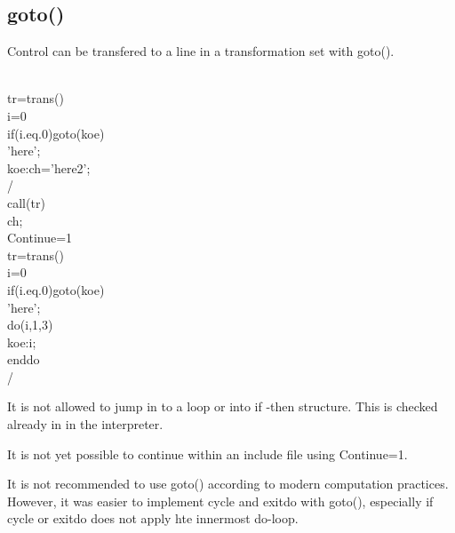 \subsection{\textcolor{VioletRed}{goto}()}
\label{goto}
Control can be transfered to a line in a transformation set with \textcolor{VioletRed}{goto}().
\begin{example}[gotoex]\\
\label{gotoex}
tr=\textcolor{VioletRed}{trans}()\\
i=0\\
\textcolor{VioletRed}{if}(i.eq.0)\textcolor{VioletRed}{goto}(koe)\\
'here';\\
koe:ch='here2';\\
/\\
\textcolor{VioletRed}{call}(tr)\\
ch;\\
Continue=1\\
tr=\textcolor{VioletRed}{trans}()\\
i=0\\
\textcolor{VioletRed}{if}(i.eq.0)\textcolor{VioletRed}{goto}(koe)\\
'here';\\
\textcolor{VioletRed}{do}(i,1,3)\\
koe:i;\\
enddo\\
/
\end{example}
\begin{note}
It is not allowed to jump in to a loop or into if -then structure. This is
checked already in in the interpreter.
\end{note}
\begin{note}
It is not yet possible to continue within an include file using Continue=1.
\end{note}
\begin{note}
It is not recommended to use \textcolor{VioletRed}{goto}() according to modern computation practices.
However, it was easier to implement cycle and exitdo with \textcolor{VioletRed}{goto}(), especially if
cycle or exitdo does not apply hte innermost do-loop.
\end{note}
